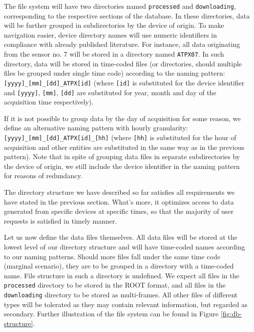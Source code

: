 
The file system will have two directories named \texttt{processed} and \texttt{downloading}, corresponding to the respective sections of the database. In these directories, data will be further grouped in subdirectories by the device of origin. To make navigation easier, device directory names will use numeric identifiers in compliance with already published literature. For instance, all data originating from the sensor no. 7 will be stored in a directory named \texttt{ATPX07}. In such directory, data will be stored in time-coded files (or directories, should multiple files be grouped under single time code) according to the naming pattern: \texttt{[yyyy]\_[mm]\_[dd]\_ATPX[id]} (where \texttt{[id]} is substituted for the device identifier and \texttt{[yyyy]}, \texttt{[mm]}, \texttt{[dd]} are substituted for year, month and day of the acquisition time respectively).

If it is not possible to group data by the day of acquisition for some reason, we define an alternative naming pattern with hourly granularity: \texttt{[yyyy]\_[mm]\_[dd]\_ATPX[id]\_[hh]} (where \texttt{[hh]} is substituted for the hour of acquisition and other entities are substituted in the same way as in the previous pattern). Note that in spite of grouping data files in separate subdirectories by the device of origin, we still include the device identifier in the naming pattern for reasons of redundancy.

The directory structure we have described so far satisfies all requirements we have stated in the previous section. What's more, it optimizes access to data generated from specific devices at specific times, so that the majority of user requests is satisfied in timely manner.

Let us now define the data files themselves. All data files will be stored at the lowest level of our directory structure and will have time-coded names according to our naming patterns. Should more files fall under the same time code (marginal scenario), they are to be grouped in a directory with a time-coded name. File structure in such a directory is undefined. We expect all files in the \texttt{processed} directory to be stored in the ROOT format, and all files in the \texttt{downloading} directory to be stored as multi-frames. All other files of different types will be tolerated as they may contain relevant information, but regarded as secondary. Further illustration of the file system can be found in Figure \ref{fig:db-structure}.

